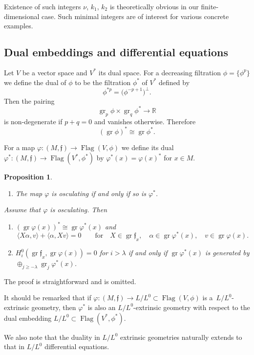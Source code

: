 \documentclass[pdftex]{sigma}%
\newcommand{\R}{\mathbb R}
\newcommand{\f}{\mathfrak f}
\newcommand{\Flag}{\operatorname{Flag}}
\newcommand{\gr}{\operatorname{gr}}
\newtheorem{prop}[thm]{Proposition}
\numberwithin{equation}{section}
\begin{document}
Existence of such integers $\nu$, $k_1$, $k_2$ is theoretically obvious in our finite-dimensional case. Such minimal integers are of interest for various concrete examples.

\subsection{Dual embeddings and differential equations}
Let $V$ be a vector space and $V^*$ its dual space. For a decreasing filtration $\phi=\{\phi^p\}$ we define the dual of $\phi$ to be the filtration $\phi^*$ of $V^*$ defined by
\[
\phi^{*p} = \big(\phi^{-p+1}\big)^\perp.
\]
Then the pairing
\[
\gr_p\phi \times \gr_q\phi^* \to \R
\]
is non-degenerate if $p+q=0$ and vanishes otherwise. Therefore
\[
(\gr\phi)^* \cong \gr\phi^*.
\]

For a map $\varphi\colon (M,\f) \to \Flag(V,\phi)$ we define its dual
$\varphi^*\colon (M,\f)\to \Flag(V^*,\phi^*)$ by $\varphi^*(x) = \varphi(x)^*$ for $x\in M$.

\begin{prop}\label{dual}\
	\begin{enumerate}\itemsep=0pt
		\item[$1.$] The map $\varphi$ is osculating if and only if so is $\varphi^*$.
	\end{enumerate}
 Assume that $\varphi$ is osculating. Then
 \begin{enumerate}\itemsep=0pt
 	\item[$2.$] $(\gr \varphi(x))^* \cong \gr\varphi^*(x)$ and
 	\[
 	 \langle X\alpha,v\rangle + \langle \alpha, Xv\rangle=0\qquad\text{for}\quad X\in\gr\f_x,\quad
 \alpha\in \gr\varphi^*(x),\quad v\in\gr\varphi(x).
 	\]
 	\item[$3.$] $H^0_i\left(\gr\f_x, \gr\varphi(x)\right)=0$ for $i>\lambda$ if and only if $\gr\varphi^*(x)$ is generated by $\oplus_{j\ge -\lambda} \gr_j\varphi^*(x)$.
 \end{enumerate}
\end{prop}
The proof is straightforward and is omitted.

It should be remarked that if $\varphi\colon (M,\f)\to L/L^0\subset \Flag(V,\phi)$ is a~$L/L^0$-extrinsic geometry, then $\varphi^*$ is also an $L/L^0$-extrinsic geometry with respect to the dual embedding $L/L^0\subset \Flag(V^*,\phi^*)$.

We also note that the duality in $L/ L^0$ extrinsic geometries naturally extends to that in $L/L^0$ differential equations.
\end{document}
